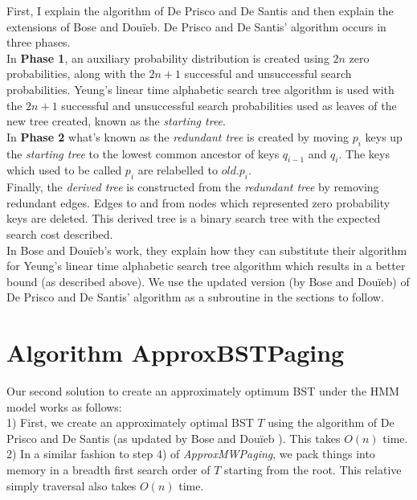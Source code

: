 \documentclass[letterpaper,12pt,titlepage,oneside,final]{book}
\theoremstyle{plain}
\begin{document}
First, I explain the algorithm of De Prisco and De Santis and then explain the extensions of Bose and Dou\"{i}eb. De Prisco and De Santis' algorithm occurs in three phases.\\

In \textbf{Phase 1}, an auxiliary probability distribution is created using $2n$ zero probabilities, along with the $2n+1$ successful and unsuccessful search probabilities. Yeung's linear time alphabetic search tree algorithm is used with the $2n+1$ successful and unsuccessful search probabilities used as leaves of the new tree created, known as the \textit{starting tree}. \\

In \textbf{Phase 2} what's known as the \textit{redundant tree} is created by moving $p_i$ keys up the \textit{starting tree} to the lowest common ancestor of keys $q_{i-1}$ and $q_i$. The keys which used to be called $p_i$ are relabelled to $old.p_i$. \\

Finally, the \textit{derived tree} is constructed from the \textit{redundant tree} by removing redundant edges. Edges to and from nodes which represented zero probability keys are deleted. This derived tree is a binary search tree with the expected search cost described. \\

In Bose and Dou\"{i}eb's work, they explain how they can substitute their algorithm for Yeung's linear time alphabetic search tree algorithm which results in a better bound (as described above). We use the updated version (by Bose and Dou\"{i}eb) of De Prisco and De Santis' algorithm as a subroutine in the sections to follow.

\section{Algorithm ApproxBSTPaging}

Our second solution to create an approximately optimum BST under the HMM model works as follows: \\

1) First, we create an approximately optimal BST $T$ using the algorithm of De Prisco and De Santis \cite{de1993binary} (as updated by Bose and Dou\"{i}eb \cite{bose2009efficient}). This takes $O(n)$ time. \\

2) In a similar fashion to step 4) of \textit{ApproxMWPaging}, we pack things into memory in a breadth first search order of $T$ starting from the root. This relative simply traversal also takes $O(n)$ time. \\
\end{document}
